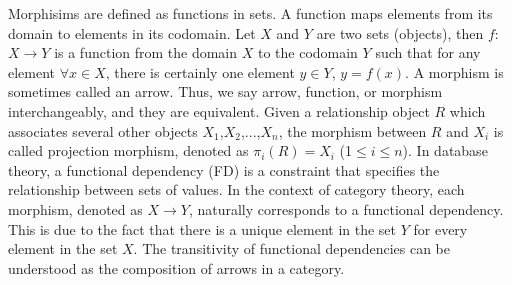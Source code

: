 




Morphisims are defined as functions in sets. A function maps elements from its domain to elements in its codomain. Let $X$ and $Y$ are two sets (objects), then $f$: $X \to Y $ is a function  from the domain $X$ to the codomain $Y$ such that for any element $\forall  x \in X$,  there is certainly one element $y \in Y$, $ y = f(x)$. A morphism is sometimes called an arrow. Thus, we say arrow, function, or morphism interchangeably, and they are equivalent. Given a relationship object $R$ which associates several other objects $X_1$,$X_2$,...,$X_n$, the morphism between $R$ and $X_i$ is called projection morphism, denoted as $\pi_i(R)=X_i$ 
 (1$\leq$$i$$\leq$$n$).   In database theory, a functional dependency (FD) is a constraint that specifies the relationship between sets of values.  In the context of category theory, each morphism, denoted as $X \to Y$, naturally corresponds to a functional dependency. This is due to the fact that there is a unique element in the set $Y$ for every element in the set $X$. The transitivity of functional dependencies can be understood as the composition of arrows in a category.



